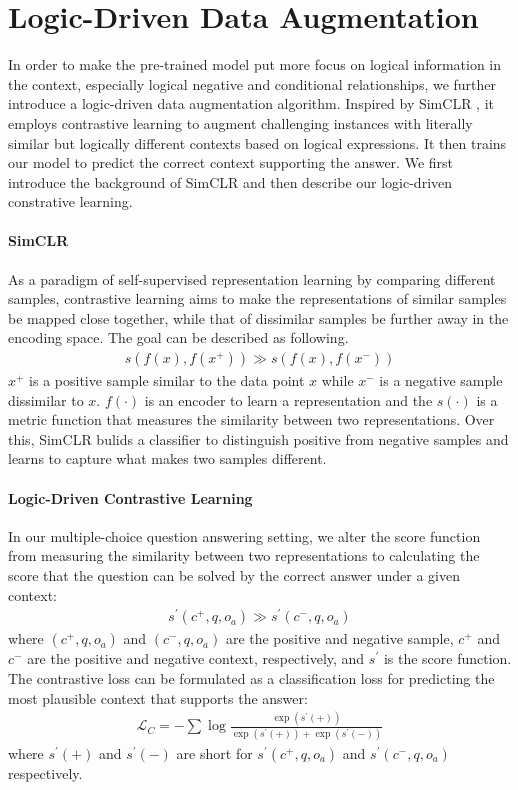 \documentclass[11pt,a4paper]{article}
\begin{document}
\section{Logic-Driven Data Augmentation}
In order to make the pre-trained model put more focus on logical information in the context, especially logical negative and conditional relationships, we further introduce a logic-driven data augmentation algorithm. Inspired by SimCLR \cite{chen2020simple}, it employs contrastive learning to augment challenging instances with literally similar but logically different contexts based on logical expressions. It then trains our model to predict the correct context supporting the answer.
We first introduce the background of SimCLR and then describe our logic-driven constrative learning. 


\paragraph{SimCLR}
As a paradigm of self-supervised representation learning by comparing different samples,
contrastive learning  \cite{wu2018unsupervised, le2020contrastive, he2020momentum} aims to make the representations of similar samples be mapped close together, while that of dissimilar samples be further away in the encoding space. The goal can be described as following.
\begin{align}
    s(f(x), f(x^+)) \gg s(f(x), f(x^-))
\end{align}
$x^+$ is a positive sample similar to the data point $x$ while $x^-$ is a negative sample dissimilar to $x$. $f(\cdot)$ is an encoder to learn a representation and the $s(\cdot)$ is a metric function that measures the similarity between two representations. 
Over this, SimCLR \cite{chen2020simple} bulids a classifier to distinguish positive from negative samples and learns to capture what makes two samples different. 


\paragraph{Logic-Driven Contrastive Learning} In our multiple-choice question answering setting, we alter the score function from measuring the similarity between two representations to calculating the score that the question can be solved by the correct answer under a given context:
\begin{align}
    s^{'}(c^+, q, o_a) \gg s^{'}(c^-, q, o_a)
\end{align}
where $(c^+, q, o_a)$ and $(c^-, q, o_a)$ are the positive and negative sample, $c^+$ and $c^-$ are the positive and negative context, respectively, and $s^{'}$ is the score function.
The contrastive loss can be formulated as a classification loss for predicting the most plausible context that supports the answer:
\begin{align}
    \mathcal{L}_C = -\sum \log\frac{\exp(s^{'}(+))}{\exp(s^{'}(+))+\exp(s^{'}(-))}
\end{align}
where $s^{'}(+)$ and $s^{'}(-)$ are short for $s^{'}(c^+, q, o_a)$ and $s^{'}(c^-, q, o_a)$ respectively. 
\end{document}

